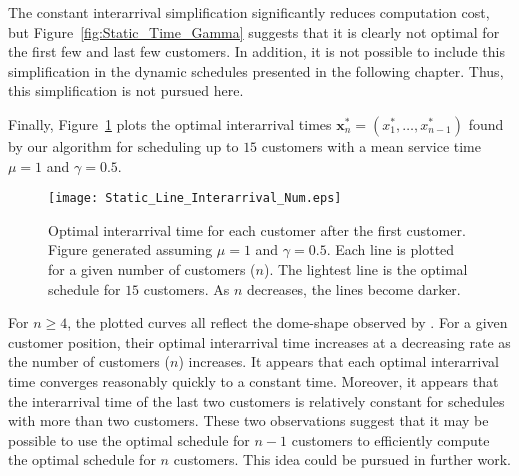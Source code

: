 The constant interarrival simplification significantly reduces computation cost, but Figure~\ref{fig:Static_Time_Gamma} suggests that it is clearly not optimal for the first few and last few customers. In addition, it is not possible to include this simplification in the dynamic schedules presented in the following chapter. Thus, this simplification is not pursued here.

Finally, Figure~\ref{fig:Static_Time_Num} plots the optimal interarrival times $\mathbf{x}_{n}^{*} = (x_{1}^{*}, \ldots, x_{n - 1}^{*})$ found by our algorithm for scheduling up to $15$ customers with a mean service time $\mu = 1$ and $\gamma = 0.5$.
\begin{figure}[htb]
	\centering
	\texttt{[image: Static\_Line\_Interarrival\_Num.eps]}
	\caption{Optimal interarrival time for each customer after the first customer. Figure generated assuming $\mu = 1$ and $\gamma = 0.5$. Each line is plotted for a given number of customers ($n$). The lightest line is the optimal schedule for $15$ customers. As $n$ decreases, the lines become darker.}
	\label{fig:Static_Time_Num}
\end{figure}

For $n \geq 4$, the plotted curves all reflect the dome-shape observed by \citet{Stein}. For a given customer position, their optimal interarrival time increases at a decreasing rate as the number of customers ($n$) increases. It appears that each optimal interarrival time converges reasonably quickly to a constant time. Moreover, it appears that the interarrival time of the last two customers is relatively constant for schedules with more than two customers. These two observations suggest that it may be possible to use the optimal schedule for $n - 1$ customers to efficiently compute the optimal schedule for $n$ customers. This idea could be pursued in further work.








































